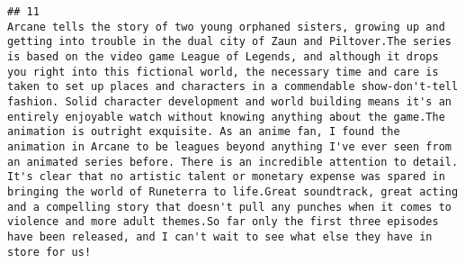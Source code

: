 \documentclass[
]{article}
\begin{document}
\begin{verbatim}
## 11                                                                                                                                                                                                                                                                                                                                                                                                                                                                                                                                                                                                                                                                                                                                                                                                                                                                                                                                                                                                                                                                                                                                                                                                                                                                                                                                                                                                                                                                                                                                                                                                                                                                                                                                                                                                                                                                                                                                                                           Arcane tells the story of two young orphaned sisters, growing up and getting into trouble in the dual city of Zaun and Piltover.The series is based on the video game League of Legends, and although it drops you right into this fictional world, the necessary time and care is taken to set up places and characters in a commendable show-don't-tell fashion. Solid character development and world building means it's an entirely enjoyable watch without knowing anything about the game.The animation is outright exquisite. As an anime fan, I found the animation in Arcane to be leagues beyond anything I've ever seen from an animated series before. There is an incredible attention to detail. It's clear that no artistic talent or monetary expense was spared in bringing the world of Runeterra to life.Great soundtrack, great acting and a compelling story that doesn't pull any punches when it comes to violence and more adult themes.So far only the first three episodes have been released, and I can't wait to see what else they have in store for us!

\end{verbatim}
\end{document}
